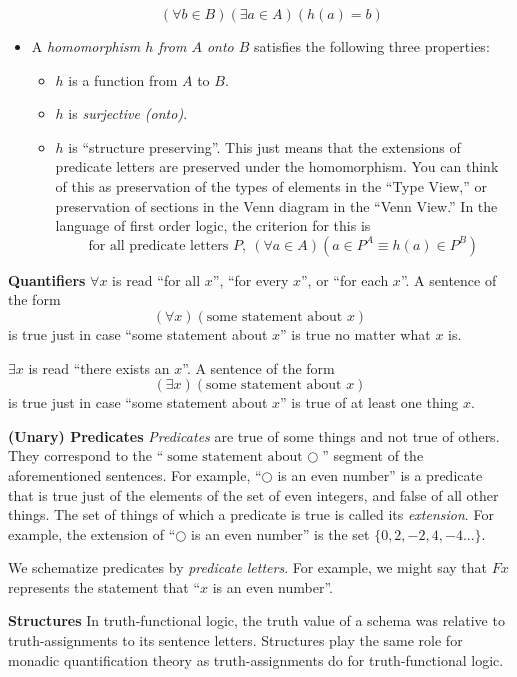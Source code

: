 \begin{mdframed}[linewidth=1]
\begin{itemize}
        \[
             (\forall b \in B)(\exists a \in A)(h(a) = b)
         \] 
    \item A \emph{homomorphism $h$ from $A$ onto $B$} satisfies the following three properties:
    \begin{itemize}
        \item $h$ is a function from $A$ to $B$.
        \item $h$ is \emph{surjective (onto)}. 
        \item $h$ is ``structure preserving''. This just means that the extensions of predicate letters are preserved under the homomorphism. You can think of this as preservation of the types of elements in the ``Type View,'' or preservation of sections in the Venn diagram in the ``Venn View.'' In the language of first order logic, the criterion for this is
        \[
            \text{for all  predicate letters }P,\ (\forall a \in A)(a \in P^A \equiv h(a)\in P^B)
        \]
    \end{itemize}

\end{itemize}

\textbf{Quantifiers}
$\forall x$ is read ``for all $x$'', ``for every $x$'', or ``for each $x$''. A sentence of the form $$(\forall x)(\text{some statement about }x)$$ is true just in case ``some statement about $x$'' is true no matter what $x$ is. 

$\exists x$ is read ``there exists an $x$''. A sentence of the form $$(\exists x)(\text{some statement about }x)$$ is true just in case ``some statement about $x$'' is true of at least one thing $x$. 

\textbf{(Unary) Predicates}
\emph{Predicates}  are true of some things and not true of others. They correspond to the ``$\text{some statement about }\bigcirc$'' segment of the aforementioned sentences. For example, ``$\bigcirc$ is an even number'' is a predicate that is true just of the elements of the set of even integers, and false of all other things. The set of things of which a predicate is true is called its \emph{extension}. For example, the extension of ``$\bigcirc$ is an even number'' is the set $\{0, 2, -2, 4, -4...\}$. 

We schematize predicates by \emph{predicate letters}. For example, we might say that $Fx$ represents the statement that ``$x$ is an even number''.

\textbf{Structures}
In truth-functional logic, the truth value of a schema was relative to truth-assignments to its sentence letters. Structures play the same role for monadic quantification theory as truth-assignments do for truth-functional logic. 
 

\end{mdframed}
